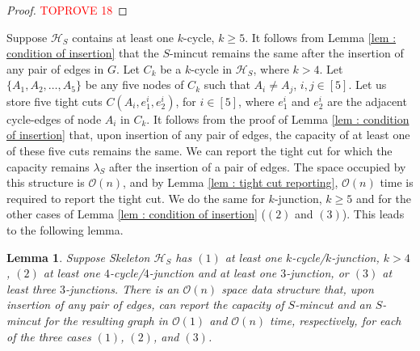 \documentclass[letterpaper,11pt]{article}
\newtheorem{lemma}{Lemma}[]
\begin{document}
\begin{proof}\textcolor{red}{TOPROVE 18}\end{proof}
Suppose ${\mathcal H}_S$ contains at least one $k$-cycle, $k\ge 5$. It follows from Lemma \ref{lem : condition of insertion} that the $S$-mincut remains the same after the insertion of any pair of edges in $G$. Let $C_k$ be a $k$-cycle in ${\mathcal H}_S$, where $k>4$. Let $\{A_1,A_2,\ldots,A_5\}$ be any five nodes of $C_k$ such that $A_i\ne A_j$, $i,j\in [5]$. Let us store five tight cuts $C(A_i,e_1^i,e_2^i)$, for $i\in [5]$, where $e_1^i$ and $e_2^i$ are the adjacent cycle-edges of node $A_i$ in $C_k$. It follows from the proof of Lemma \ref{lem : condition of insertion} that, upon insertion of any pair of edges, the capacity of at least one of these five cuts remains the same. We can report the tight cut for which the capacity remains $\lambda_S$ after the insertion of a pair of edges. 
The space occupied by this structure is ${\mathcal O}(n)$, and by Lemma \ref{lem : tight cut reporting}, ${\mathcal O}(n)$ time is required to report the tight cut. We do the same for $k$-junction, $k\ge 5$ and for the other cases of Lemma \ref{lem : condition of insertion} ($(2)$ and $(3)$). This leads to the following lemma.
\begin{lemma} \label{lem : does not increase conditions}
    Suppose Skeleton ${\mathcal H}_S$ has $(1)$ at least one $k$-cycle/$k$-junction, $k>4$, $(2)$ at least one $4$-cycle/$4$-junction and at least one $3$-junction, or $(3)$ at least three $3$-junctions. There is an ${\mathcal O}(n)$ space data structure that, upon insertion of any pair of edges, can report the capacity of $S$-mincut and an $S$-mincut for the resulting graph in ${\mathcal O}(1)$ and ${\mathcal O}(n)$ time, respectively, for each of the three cases $(1)$, $(2)$, and $(3)$.   
\end{lemma}
\end{document}
